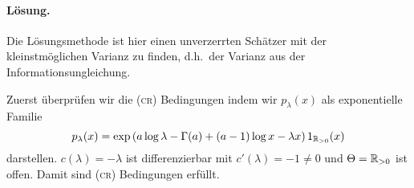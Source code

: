 \paragraph*{Lösung.  } Die Lösungsmethode ist hier einen unverzerrten Schätzer mit der
kleinstmöglichen Varianz zu finden, d.h.\ der Varianz aus der Informationsungleichung.

Zuerst überprüfen wir die (\textsc{cr}) Bedingungen indem wir $p_\lambda(x)$ als
exponentielle Familie
\begin{equation}
    p_\lambda(x) = \exp\left( a\log \lambda -\Gamma(a) +(a-1)\log x -\lambda x  \right) 1_{\mathbb R_{>0}}(x)    
\end{equation}
darstellen. $c(\lambda)=-\lambda$ ist differenzierbar mit $c'(\lambda)=-1\neq 0$ und 
$\Theta=\mathbb R_{>0}$ ist offen. Damit sind \textsc{(cr)} Bedingungen erfüllt.

